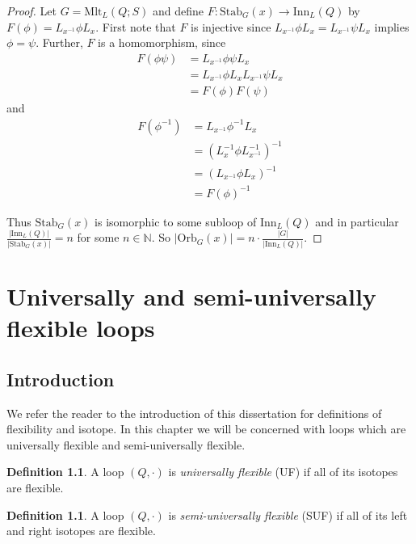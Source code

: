 \documentclass[12pt, twoside, openright]{report}
\theoremstyle{definition}
\newtheorem{dfn}[thm]{Definition}
\newcommand{\mlt}{\text{Mlt}}       %
\newcommand{\inn}{\text{Inn}}       %
\newcommand{\stb}{\text{Stab}}		  %
\newcommand{\orb}{\text{Orb}}		    %
\begin{document}
\begin{proof}
Let $G = \mlt_L(Q; S)$ and define $F: \stb_G(x)\to \inn_L(Q)$ by $F(\phi) = L_{x^{-1}}\phi L_x$.
  First note that $F$ is injective since $L_{x^{-1}}\phi L_x = L_{x^{-1}}\psi L_x$ implies
  $\phi = \psi$. Further, $F$ is a homomorphism, since
  \begin{align*}
    F(\phi\psi) &= L_{x^{-1}}\phi\psi L_x\\
    &= L_{x^{-1}}\phi L_x L_{x^{-1}} \psi L_x\\
    &= F(\phi)F(\psi)
  \end{align*}
and
  \begin{align*}
    F(\phi^{-1}) &= L_{x^{-1}}\phi^{-1}L_x\\
    &= (L_x^{-1}\phi L_{x^{-1}}^{-1})^{-1}\\
    &= (L_{x^{-1}}\phi L_x)^{-1}\\
    &= F(\phi)^{-1}
  \end{align*}

Thus $\stb_G(x)$ is isomorphic to some subloop of $\inn_L(Q)$ and in particular
  $\frac{|\inn_L(Q)|}{|\stb_G(x)|} = n$ for some $n\in \mathbb{N}$. So
  $|\orb_G(x)| = n\cdot \frac{|G|}{|\inn_L(Q)|}$.
\end{proof}


\chapter{Universally and semi-universally flexible loops}

\section{Introduction}

We refer the reader to the introduction of this dissertation for definitions of flexibility and
  isotope. In this chapter we will be concerned with loops which are universally flexible
  and semi-universally flexible.

\begin{dfn}
  A loop $(Q, \cdot)$ is \emph{universally flexible} (UF) if all of its isotopes are flexible.
\end{dfn}

\begin{dfn}
  A loop $(Q, \cdot)$ is \emph{semi-universally flexible} (SUF) if all of its left and
    right isotopes are flexible.
\end{dfn}
\end{document}

